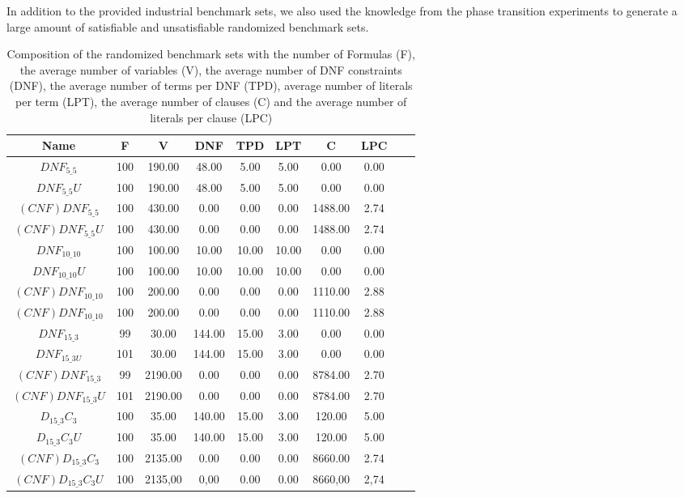 In addition to the provided industrial benchmark sets, we also used the knowledge from the phase transition experiments to generate a large amount of satisfiable and unsatisfiable randomized benchmark sets.

\begin{table}[!htb]
\centering
\caption[Composition of the randomized benchmark sets]{Composition of the randomized benchmark sets with the number of Formulas (F), the average number of variables (V), the average number of DNF constraints (DNF), the average number of terms per DNF (TPD), average number of literals per term (LPT), the average number of clauses (C) and the average number of literals per clause (LPC)}
\label{tab:randomizedBenchmarks}
\begin{tabular}{|c|c|c|c|c|c|c|c|c|c|}
\hline
Name & F & V & DNF & TPD & LPT & C & LPC \\
\hline
$DNF_{5\_5}$ & 100 & 190.00 & 48.00 & 5.00 & 5.00 & 0.00 & 0.00 \\ 
 \hline 
$DNF_{5\_5}U$ & 100 & 190.00 & 48.00 & 5.00 & 5.00 & 0.00 & 0.00 \\ 
 \hline 
$(CNF)DNF_{5\_5}$ & 100 & 430.00 & 0.00 & 0.00 & 0.00 & 1488.00 & 2.74 \\ 
 \hline 
$(CNF)DNF_{5\_5}U$ & 100 & 430.00 & 0.00 & 0.00 & 0.00 & 1488.00 & 2.74 \\ 
 \hline 
 $DNF_{10\_10}$ & 100 & 100.00 & 10.00 & 10.00 & 10.00 & 0.00 & 0.00 \\ 
 \hline 
$DNF_{10\_10}U$ & 100 & 100.00 & 10.00 & 10.00 & 10.00 & 0.00 & 0.00 \\ 
 \hline 
$(CNF)DNF_{10\_10}$ & 100 & 200.00 & 0.00 & 0.00 & 0.00 & 1110.00 & 2.88 \\ 
 \hline 
$(CNF)DNF_{10\_10}$ & 100 & 200.00 & 0.00 & 0.00 & 0.00 & 1110.00 & 2.88 \\ 
\hline
$DNF_{15\_3}$ & 99 & 30.00 & 144.00 & 15.00 & 3.00 & 0.00 & 0.00\\ 
 \hline 
$DNF_{15\_3U}$ & 101 & 30.00 & 144.00 & 15.00 & 3.00 & 0.00 & 0.00  \\ 
 \hline 
$(CNF)DNF_{15\_3}$ & 99 & 2190.00 & 0.00 & 0.00 & 0.00 & 8784.00 & 2.70 \\ 
 \hline 
$(CNF)DNF_{15\_3}U$ & 101 & 2190.00 & 0.00 & 0.00 & 0.00 & 8784.00 & 2.70 \\ 
 \hline
$D_{15\_3}C_3$ & 100 & 35.00 & 140.00 & 15.00 & 3.00 & 120.00 & 5.00 \\ 
 \hline 
$D_{15\_3}C_3U$ & 100 & 35.00 & 140.00 & 15.00 & 3.00 & 120.00 & 5.00 \\ 
 \hline 
$(CNF)D_{15\_3}C_3$ & 100 & 2135.00 & 0.00 & 0.00 & 0.00 & 8660.00 & 2.74 \\ 
 \hline 
$(CNF)D_{15\_3}C_3U$ & 100 & 2135,00 & 0,00 & 0.00 & 0.00 & 8660,00 & 2,74 \\ 
 \hline 
\end{tabular}
\end{table}

